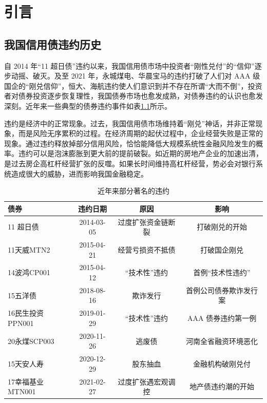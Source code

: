 
\chapter{引言}

\section{我国信用债违约历史}

自 2014 年“11 超日债”违约以来，我国信用债市场中投资者“刚性兑付”的“信仰”逐步动摇、破灭。及至 2021 年，永城煤电、华晨宝马的违约打破了人们对 AAA 级国企的“刚兑信仰”，恒大、海航违约使人们意识到并不存在所谓“大而不倒”，投资者对债券投资逐步恢复理性，我国债券市场也愈发成熟，对债券违约的认识也愈发深刻。近年来一些典型的债券违约事件如表\ref{tab:defaults_in_history}所示。

违约是经济中的正常现象。过去，我国信用债市场维持着“刚兑”神话，并非正常现象，而是风险无序累积的过程。在经济周期的起伏过程中，企业经营失败是正常的现象。通过违约释放掉部分信用风险，恰恰能降低大规模系统性金融风险发生的概率。违约可以是泡沫膨胀到更大前的提前破裂。如近期的房地产企业的加速出清，是过去房企高杠杆经营扩张的反噬。如果长时间维持高杠杆经营，势必会对银行系统造成很大的威胁，进而影响我国金融稳定。
\begin{table}[h]
	\caption{近年来部分著名的违约}
	\centering
	\begin{tabular}{lccc}
		债券             & 违约日期   & 原因               & 影响                   \\ \hline
		11 超日债        & 2014-03-05 & 过度扩张资金链断裂 & 打破刚兑的开始         \\
		11天威MTN2       & 2015-04-21 & 经营亏损资不抵债   & 打破国企刚兑           \\
		14波鸿CP001      & 2015-04-12 & “技术性”违约       & 首例“技术性违约”       \\
		15五洋债         & 2018-08-16 & 欺诈发行           & 首例公司债券欺诈发行案 \\
		16民生投资PPN001 & 2019-01-29 & “技术性”违约       & AAA 债券违约第一例     \\
		20永煤SCP003     & 2020-11-26 & 逃废债             & 河南全省融资环境恶化   \\
		15天安人寿       & 2020-12-29 & 股东抽血           & 金融机构破刚兑付       \\
		17幸福基业MTN001 & 2021-02-27 & 过度扩张遇宏观调控 & 地产债违约潮的开始     \\
	\end{tabular}
	\label{tab:defaults_in_history}
\end{table}

